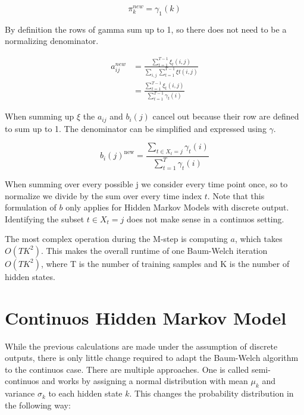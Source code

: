 \begin{equation}
  \pi_{k}^{n e w}=\gamma_{1}(k) 
\end{equation}

By definition the rows of gamma sum up to 1, so there does not need to be a normalizing denominator.

\begin{equation}
   \begin{aligned}
   a_{i j}^{n e w}&=\frac{\sum_{t=1}^{T-1} \xi_{t}(i, j)}{\sum_{i,j}  \sum_{t=1}^{T-1} \xi{t}(i,j)} \\
   &=\frac{\sum_{t=1}^{T-1} \xi_{t}(i, j)}{\sum_{t=1}^{T-1} \gamma_{t}(i)} 
   \end{aligned}
\end{equation}

When summing up $\xi$ the $a_{ij}$ and $b_i(j)$ cancel out because their row are defined to sum up to 1. The denominator can be simplified and expressed using $\gamma$.

\begin{equation}
   b_{i}(j)^{\text {new}}=\frac{\sum_{t \in X_t = j} \gamma_{t}(i) }{\sum_{t=1}^{T} \gamma_{t}(i)}
\end{equation}

When summing over every possible j we consider every time point once, so to normalize we divide by the sum over every time index $t$. Note that this formulation of $b$ only applies for Hidden Markov Models with discrete output. Identifying the subset $t \in X_t=j$ does not make sense in a continuos setting. 

The most complex operation during the M-step is computing $a$, which takes $O(TK^2)$. This makes the overall runtime of one Baum-Welch iteration $O(TK^2)$, where T is the number of training samples and K is the number of hidden states. \parencite{miningmassivedatasets}

\section{Continuos Hidden Markov Model}

While the previous calculations are made under the assumption of discrete outputs, there is only little change required to adapt the Baum-Welch algorithm to the continuos case. There are multiple approaches. One is called semi-continuos and works by assigning a normal distribution with mean $\mu_k$ and variance $\sigma_k$ to each hidden state $k$. This changes the probability distribution in the following way:


